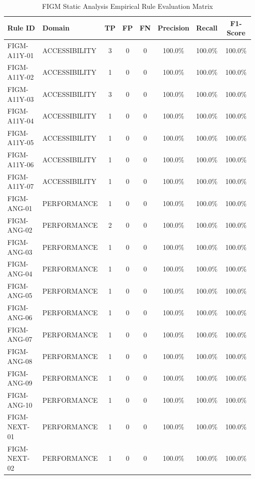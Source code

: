 \begin{table}[htbp]
\centering
\caption{FIGM Static Analysis Empirical Rule Evaluation Matrix}
\label{tab:figm_rule_evaluation}
\begin{tabular}{llcccccc}
\toprule
\textbf{Rule ID} & \textbf{Domain} & \textbf{TP} & \textbf{FP} & \textbf{FN} & \textbf{Precision} & \textbf{Recall} & \textbf{F1-Score} \\
\midrule
FIGM-A11Y-01 & ACCESSIBILITY & 3 & 0 & 0 & 100.0\% & 100.0\% & 100.0\% \\
FIGM-A11Y-02 & ACCESSIBILITY & 1 & 0 & 0 & 100.0\% & 100.0\% & 100.0\% \\
FIGM-A11Y-03 & ACCESSIBILITY & 3 & 0 & 0 & 100.0\% & 100.0\% & 100.0\% \\
FIGM-A11Y-04 & ACCESSIBILITY & 1 & 0 & 0 & 100.0\% & 100.0\% & 100.0\% \\
FIGM-A11Y-05 & ACCESSIBILITY & 1 & 0 & 0 & 100.0\% & 100.0\% & 100.0\% \\
FIGM-A11Y-06 & ACCESSIBILITY & 1 & 0 & 0 & 100.0\% & 100.0\% & 100.0\% \\
FIGM-A11Y-07 & ACCESSIBILITY & 1 & 0 & 0 & 100.0\% & 100.0\% & 100.0\% \\
FIGM-ANG-01 & PERFORMANCE & 1 & 0 & 0 & 100.0\% & 100.0\% & 100.0\% \\
FIGM-ANG-02 & PERFORMANCE & 2 & 0 & 0 & 100.0\% & 100.0\% & 100.0\% \\
FIGM-ANG-03 & PERFORMANCE & 1 & 0 & 0 & 100.0\% & 100.0\% & 100.0\% \\
FIGM-ANG-04 & PERFORMANCE & 1 & 0 & 0 & 100.0\% & 100.0\% & 100.0\% \\
FIGM-ANG-05 & PERFORMANCE & 1 & 0 & 0 & 100.0\% & 100.0\% & 100.0\% \\
FIGM-ANG-06 & PERFORMANCE & 1 & 0 & 0 & 100.0\% & 100.0\% & 100.0\% \\
FIGM-ANG-07 & PERFORMANCE & 1 & 0 & 0 & 100.0\% & 100.0\% & 100.0\% \\
FIGM-ANG-08 & PERFORMANCE & 1 & 0 & 0 & 100.0\% & 100.0\% & 100.0\% \\
FIGM-ANG-09 & PERFORMANCE & 1 & 0 & 0 & 100.0\% & 100.0\% & 100.0\% \\
FIGM-ANG-10 & PERFORMANCE & 1 & 0 & 0 & 100.0\% & 100.0\% & 100.0\% \\
FIGM-NEXT-01 & PERFORMANCE & 1 & 0 & 0 & 100.0\% & 100.0\% & 100.0\% \\
FIGM-NEXT-02 & PERFORMANCE & 1 & 0 & 0 & 100.0\% & 100.0\% & 100.0\% \\

\end{tabular}
\end{table}
